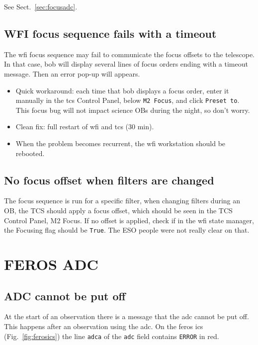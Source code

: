 \documentclass[11pt,fleqn]{book} %
\begin{document}
See Sect.~\ref{sec:focusadc}.

\subsection{WFI focus sequence fails with a timeout}
\label{sec:wfifocseq}
The \gls{wfi} focus sequence may fail to communicate the focus offsets to the telescope.  In that case, \gls{bob} will display several lines of focus orders ending with a timeout message. Then an error pop-up will appears.

\begin{itemize}
   \item Quick workaround: each time that \gls{bob} displays a focus order, enter it manually in the \gls{tcs} Control Panel, below \texttt{M2 Focus}, and click \texttt{Preset to}.  This focus bug will not impact science OBs during the night, so don't worry.
   \item Clean fix: full restart of \gls{wfi} and \gls{tcs} (30 min).
   \item When the problem becomes recurrent, the \gls{wfi} workstation should
be rebooted.
\end{itemize}

\subsection{No focus offset when filters are changed}
\label{sec:filfocoffset}
The focus sequence is run for a specific filter, when changing filters during an OB, the TCS should apply a focus offset, which should be seen in the TCS Control Panel, M2 Focus. If no offset is applied, check if in the \gls{wfi} state manager, the Focusing flag should be \texttt{True}. The ESO people were not really clear on that.


\section{FEROS ADC}

\subsection{ADC cannot be put off}

At the start of an observation there is a message that the \gls{adc} cannot be
put off.  This happens after an observation using the \gls{adc}.  On the 
\gls{feros} \gls{ics} (Fig.~\ref{fig:ferosics}) the line \texttt{adca} of the
\texttt{adc} field contains \texttt{ERROR} in red.  
\end{document}
